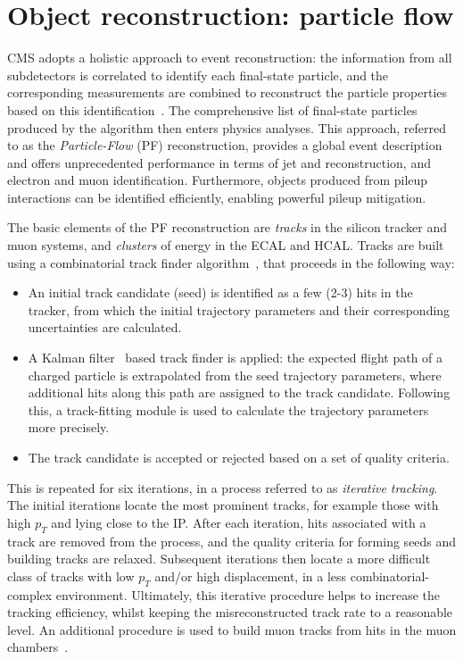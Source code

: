 \section{Object reconstruction: particle flow}\label{sec:particle_flow}
CMS adopts a holistic approach to event reconstruction: the information from all subdetectors is correlated to identify each final-state particle, and the corresponding measurements are combined to reconstruct the particle properties based on this identification~\cite{Sirunyan:2017ulk}. The comprehensive list of final-state particles produced by the algorithm then enters physics analyses. This approach, referred to as the \textit{Particle-Flow} (PF) reconstruction, provides a global event description and offers unprecedented performance in terms of jet and \met reconstruction, and electron and muon identification. Furthermore, objects produced from pileup interactions can be identified efficiently, enabling powerful pileup mitigation.

The basic elements of the PF reconstruction are \textit{tracks} in the silicon tracker and muon systems, and \textit{clusters} of energy in the ECAL and HCAL. Tracks are built using a combinatorial track finder algorithm~\cite{Chatrchyan:2014fea}, that proceeds in the following way:
\begin{itemize}
    \item An initial track candidate (seed) is identified as a few (2-3) hits in the tracker, from which the initial trajectory parameters and their corresponding uncertainties are calculated.
    \item A Kalman filter~\cite{BILLOIR1990219} based track finder is applied: the expected flight path of a charged particle is extrapolated from the seed trajectory parameters, where additional hits along this path are assigned to the track candidate. Following this, a track-fitting module is used to calculate the trajectory parameters more precisely.
    \item The track candidate is accepted or rejected based on a set of quality criteria.
\end{itemize}
\noindent
This is repeated for six iterations, in a process referred to as \textit{iterative tracking}. The initial iterations locate the most prominent tracks, for example those with high $p_T$ and lying close to the IP. After each iteration, hits associated with a track are removed from the process, and the quality criteria for forming seeds and building tracks are relaxed. Subsequent iterations then locate a more difficult class of tracks with low $p_T$ and/or high displacement, in a less combinatorial-complex environment. Ultimately, this iterative procedure helps to increase the tracking efficiency, whilst keeping the misreconstructed track rate to a reasonable level. An additional procedure is used to build muon tracks from hits in the muon chambers~\cite{Chatrchyan:2012xi}.

